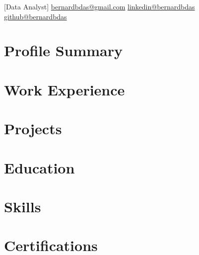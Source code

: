 \documentclass{main}
\begin{document}
[Data Analyst]{%
  \contactline%
  {\href{mailto:bernardbdas@gmail.com}{bernardbdas@gmail.com}}%
  {\href{https://linkedin.com/in/bernardbdas}{linkedin@bernardbdas}}%
  {\href{https://github.com/bernardbdas}{github@bernardbdas}}%
}


\begin{minipage}[t]{0.65\textwidth}

  \section{Profile Summary}
  
  \sectionsep

  \section{Work Experience}
  
  \sectionsep

  \section{Projects}
  
  \sectionsep

  \section{Education}
  

\end{minipage}%
\hfill
\begin{minipage}[t]{0.32\textwidth}

  \section{Skills}
  
  \sectionsep

  \section{Certifications}
  

\end{minipage}
\end{document}

